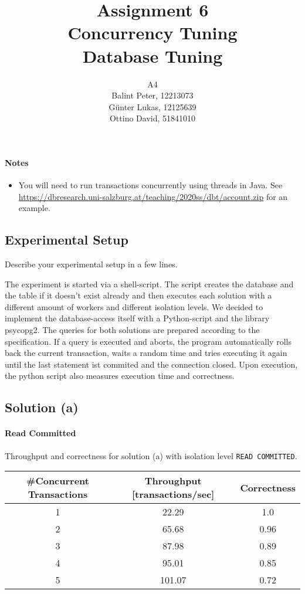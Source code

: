\documentclass[11pt]{scrartcl}
\title{
  \textbf{\large Assignment 6} \\
  Concurrency Tuning \\
  {\large Database Tuning}}
\author{
  A4 \\
  \large Balint Peter, 12213073 \\
  \large Günter Lukas, 12125639 \\
  \large Ottino David, 51841010
}
\begin{document}
\maketitle

\paragraph{Notes}

\begin{itemize}
  \item You will need to run transactions concurrently using threads in Java. See \\ \url{https://dbresearch.uni-salzburg.at/teaching/2020ss/dbt/account.zip} for an example.
\end{itemize}

\subsection*{Experimental Setup}

Describe your experimental setup in a few lines.

The experiment is started via a shell-script. The script creates the database and the table if it doesn't exist already and then executes each solution with a different amount of workers and different isolation levels. We decided to implement the database-access itself with a Python-script and the library psycopg2. The queries for both solutions are prepared according to the specification. If a query is executed and aborts, the program automatically rolls back the current transaction, waits a random time and tries executing it again until the last statement ist commited and the connection closed. Upon execution, the python script also measures execution time and correctness.

\subsection*{Solution (a)}

\paragraph{Read Committed}

Throughput and correctness for solution (a) with isolation level \lstinline[style=dbtsql]{READ COMMITTED}.

\begin{table}[H]
  \centering
  \begin{tabular}{c|c|c}
    \#Concurrent Transactions & Throughput [transactions/sec] & Correctness
      \tabularnewline
    \hline
    1 & 22.29 & 1.0 \tabularnewline
    2 & 65.68 & 0.96 \tabularnewline
    3 & 87.98 & 0.89 \tabularnewline
    4 & 95.01 & 0.85 \tabularnewline
    5 & 101.07 & 0.72 \tabularnewline
  \end{tabular}
\end{table}
\end{document}
